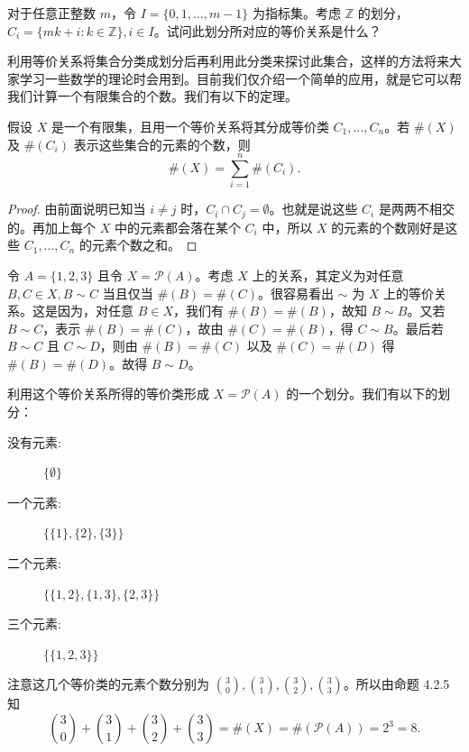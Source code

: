 \begin{question}
对于任意正整数 $m$，令 $I = \{0, 1, \dots, m - 1\}$ 为指标集。考虑 $\mathbb{Z}$ 的划分，$C_i = \{mk + i : k \in \mathbb{Z}\}, i \in I$。试问此划分所对应的等价关系是什么？
\end{question}

利用等价关系将集合分类成划分后再利用此分类来探讨此集合，这样的方法将来大家学习一些数学的理论时会用到。目前我们仅介绍一个简单的应用，就是它可以帮我们计算一个有限集合的个数。我们有以下的定理。

\begin{proposition}
假设 $X$ 是一个有限集，且用一个等价关系将其分成等价类 $C_1, \dots, C_n$。若 $\#(X)$ 及 $\#(C_i)$ 表示这些集合的元素的个数，则
$$ \#(X) = \sum_{i=1}^n \#(C_i). $$
\end{proposition}

\begin{proof}
由前面说明已知当 $i \neq j$ 时，$C_i \cap C_j = \emptyset$。也就是说这些 $C_i$ 是两两不相交的。再加上每个 $X$ 中的元素都会落在某个 $C_i$ 中，所以 $X$ 的元素的个数刚好是这些 $C_1, \dots, C_n$ 的元素个数之和。
\end{proof}

\begin{example}
令 $A = \{1, 2, 3\}$ 且令 $X = \mathcal{P}(A)$。考虑 $X$ 上的关系，其定义为对任意 $B, C \in X, B \sim C$ 当且仅当 $\#(B) = \#(C)$。很容易看出 $\sim$ 为 $X$ 上的等价关系。这是因为，对任意 $B \in X$，我们有 $\#(B) = \#(B)$，故知 $B \sim B$。又若 $B \sim C$，表示 $\#(B) = \#(C)$，故由 $\#(C) = \#(B)$，得 $C \sim B$。最后若 $B \sim C$ 且 $C \sim D$，则由 $\#(B) = \#(C)$ 以及 $\#(C) = \#(D)$ 得 $\#(B) = \#(D)$。故得 $B \sim D$。

利用这个等价关系所得的等价类形成 $X = \mathcal{P}(A)$ 的一个划分。我们有以下的划分：
\begin{description}
    \item[没有元素:] $\{\emptyset\}$
    \item[一个元素:] $\{\{1\}, \{2\}, \{3\}\}$
    \item[二个元素:] $\{\{1, 2\}, \{1, 3\}, \{2, 3\}\}$
    \item[三个元素:] $\{\{1, 2, 3\}\}$
\end{description}
注意这几个等价类的元素个数分别为 $\binom{3}{0}, \binom{3}{1}, \binom{3}{2}, \binom{3}{3}$。所以由命题 4.2.5 知
$$ \binom{3}{0} + \binom{3}{1} + \binom{3}{2} + \binom{3}{3} = \#(X) = \#(\mathcal{P}(A)) = 2^3 = 8. $$
\end{example}

